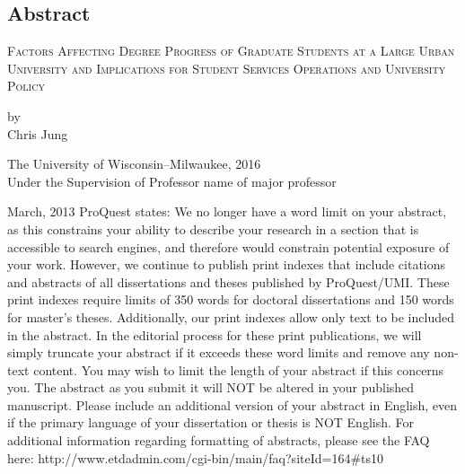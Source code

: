 \documentclass[12pt]{book}
\begin{document}
\begin{singlespacing}\chapter*{Abstract}

{\centering\LARGE \textsc{Factors Affecting Degree Progress of Graduate Students at a Large Urban University and Implications for Student Services Operations and University Policy} \par}

\phantom{}

{\centering\large by\\Chris Jung \par}

\phantom{}

{\centering\large The University of Wisconsin--Milwaukee, 2016\\Under the Supervision of Professor name of major professor \par}

\phantom{}

\noindent March, 2013 ProQuest states: We no longer have a word limit on your abstract, as this constrains your ability to describe your research in a section that is accessible to search engines, and therefore would constrain potential exposure of your work. However, we continue to publish print indexes that include citations and abstracts of all dissertations and theses published by ProQuest/UMI. These print indexes require limits of 350 words for doctoral dissertations and 150 words for master's theses. Additionally, our print indexes allow only text to be included in the abstract. In the editorial process for these print publications, we will simply truncate your abstract if it exceeds these word limits and remove any non-text content. You may wish to limit the length of your abstract if this concerns you. The abstract as you submit it will NOT be altered in your published manuscript. Please include an additional version of your abstract in English, even if the primary language of your dissertation or thesis is NOT English. For additional information regarding formatting of abstracts, please see the FAQ here: http://www.etdadmin.com/cgi-bin/main/faq?siteId=164\#ts10\par\end{singlespacing}
\setcounter{page}{2}\clearpage\phantom{}\setcounter{page}{0}\clearpage
\end{document}
